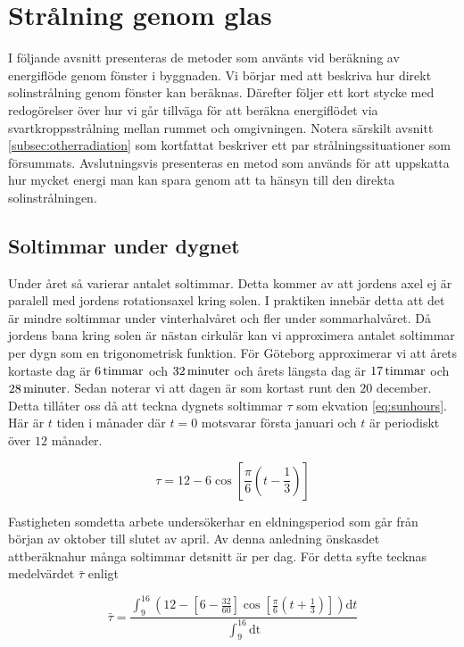 \section{Strålning genom glas}\label{sec:sunthroughwindowsmethod}

I följande avsnitt presenteras de metoder som använts vid beräkning av energiflöde genom fönster i byggnaden. Vi börjar med att beskriva hur direkt solinstrålning genom fönster kan beräknas. Därefter följer ett kort stycke med redogörelser över hur vi går tillväga för att beräkna energiflödet via svartkroppsstrålning mellan rummet och omgivningen. Notera särskilt avsnitt \ref{subsec:otherradiation} som kortfattat beskriver ett par strålningssituationer som försummats. Avslutningsvis presenteras en metod som används för att uppskatta hur mycket energi man kan spara genom att ta hänsyn till den direkta solinstrålningen.

\subsection{Soltimmar under dygnet}
\label{subsec:sunhours}
Under året så varierar antalet soltimmar. Detta kommer av att jordens axel ej är paralell
med jordens rotationsaxel kring solen. I praktiken innebär detta att det är mindre soltimmar
under vinterhalvåret och fler under sommarhalvåret. Då jordens bana kring solen är nästan
cirkulär kan vi approximera antalet soltimmar per dygn som en trigonometrisk funktion.
För Göteborg approximerar vi att årets kortaste dag är $\unit[6]{ timmar}$ och $\unit[32]{minuter}$ och årets längsta
dag är $\unit[17]{ timmar}$ och $\unit[28]{ minuter}$. \cite{sunup} Sedan noterar vi att dagen är som kortast runt den $20$
december.
Detta tillåter oss då att teckna dygnets soltimmar $\tau$ som ekvation \eqref{eq:sunhours}. Här
är $t$ tiden i månader där $t=0$ motsvarar första januari och $t$ är periodiskt över $12$ månader.

\begin{equation}
\label{eq:sunhours}
\tau = 12 - 6\cos\left[\frac{\pi}{6}\left(t-\frac{1}{3}\right)\right]
\end{equation}

\noindent
Fastigheten somdetta arbete undersökerhar en eldningsperiod som går från början av oktober
till slutet av april. Av denna anledning önskasdet attberäknahur många soltimmar detsnitt är per
dag. För detta syfte tecknas medelvärdet $\bar{\tau}$ enligt

\begin{equation}
\label{eq:taubar}
\bar{\tau}= \frac{ \int^{16}_9 \left(12 - \left[6-\frac{32}{60}\right]\cos\left[\frac{\pi}{6}\left(t+
\frac{1}{3}\right)\right]\right)\mathrm{d}t}{\int^{16}_9 \mathrm{dt}}
\end{equation}

